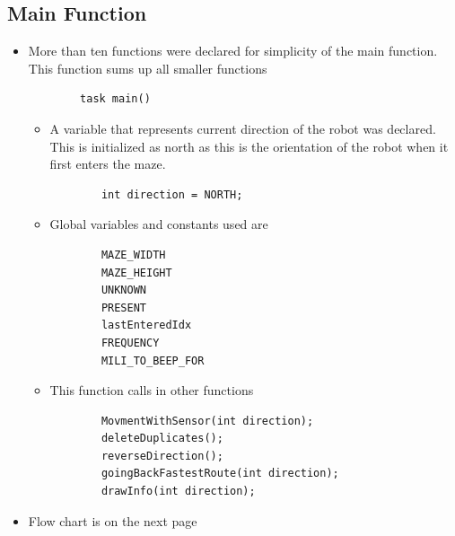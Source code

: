 \documentclass[11pt]{article}
\begin{document}

\subsection{Main Function}
\begin{itemize}
\item More than ten functions were declared for simplicity of the main function. This function sums up all smaller functions
	\begin{verbatim}
		task main()
	\end{verbatim}

	\begin{itemize}
	\item A variable that represents current direction of the robot was declared. This is initialized as north as this is the orientation of the robot when it first enters the maze.
	\begin{verbatim}
		int direction = NORTH;
	\end{verbatim}
	\item Global variables and constants used are
	\begin{verbatim}
		MAZE_WIDTH
		MAZE_HEIGHT
		UNKNOWN
		PRESENT
		lastEnteredIdx
		FREQUENCY
		MILI_TO_BEEP_FOR
	\end{verbatim}
	\item This function calls in other functions
	\begin{verbatim}
		MovmentWithSensor(int direction);
		deleteDuplicates();
		reverseDirection();
		goingBackFastestRoute(int direction);
		drawInfo(int direction);
	\end{verbatim}
	\end{itemize}
\item Flow chart is on the next page
\end{itemize}
\end{document}

